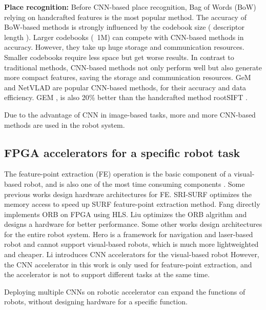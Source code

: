 \textbf{Place recognition:} Before CNN-based place recognition, Bag of Words (BoW) \cite{small_1} relying on handcrafted features is the most popular method. The accuracy of BoW-based methods is strongly influenced by the codebook size ( descriptor length ). Larger codebooks (~1M) \cite{large_1, large_2} can compete with CNN-based methods in accuracy. However, they take up huge storage and communication resources. Smaller codebooks\cite{small_1, small_2, jegou2014triang} require less space but get worse results. In contrast to traditional methods, CNN-based methods not only perform well but also generate more compact features, saving the storage and communication resources. GeM \cite{radenovic2018fine} and NetVLAD \cite{arandjelovic2016netvlad} are popular CNN-based methods, for their accuracy and data efficiency. GEM \cite{radenovic2018fine}, is also 20\% better than the handcrafted method rootSIFT \cite{jegou2014triang}.

Due to the advantage of CNN in image-based tasks, more and more CNN-based methods are used in the robot system.


\subsection{ FPGA accelerators for a specific robot task }

The feature-point extraction (FE) operation is the basic component of a visual-based robot, and is also one of the most time consuming components \cite{fang2017fpga}.
Some previous works design hardware architectures for FE.
SRI-SURF \cite{jia2016sri} optimizes the memory access to speed up SURF \cite{bay2006surf} feature-point extraction method. 
Fang \cite{fang2017fpga} directly implements ORB on FPGA using HLS. Liu \cite{liu2019eslam} optimizes the ORB algrithm and designs a hardware for better performance.
Some other works design architectures for the entire robot system. Hero \cite{shi2018hero} is a framework for navigation and laser-based robot and cannot support visual-based robots, which is much more lightweighted and cheaper. 
Li \cite{li2019879gops} introduces CNN accelerators for the visual-based robot
However, the CNN accelerator in this work\cite{li2019879gops} is only used for feature-point extraction, and the accelerator is not to support different tasks at the same time. 

Deploying multiple CNNs on robotic accelerator can expand the functions of robots, without designing hardware for a specific function.



